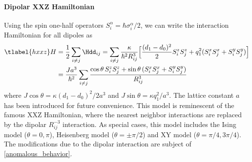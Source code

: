 \paragraph{Dipolar XXZ Hamiltonian}
Using the spin one-half operators $S^\alpha_i = \hbar \sigma^\alpha_i/2$, we can write the interaction Hamiltonian for all dipoles as
\begin{align} \tlabel{hxxz}
    H &= \frac{1}{2} \sum_{i\ne j} \Hdd_{ij} = \sum_{i\ne j} \frac{\kappa}{\hbar^2 R_{ij}^3} \Big[ \frac{(d_1-d_0)^2}{2} S^z_i S^z_j  + q_1^2 (S^x_i S^x_j + S^y_i S^y_j) \Big] \\
         &= \frac{Ja^3}{\hbar^2} \sum_{i\ne j} \frac{\cos\theta\, S^z_i S^z_j  + \sin\theta\, (S^x_i S^x_j + S^y_i S^y_j)}{R_{ij}^3}
\end{align}
where $J\cos\theta = \kappa (d_1-d_0)^2/2a^3$ and $J\sin\theta = \kappa q_1^2/a^3$. The lattice constant $a$ has been introduced for future convenience.
This model is reminescent of the famous XXZ Hamiltonian, where the nearest neighbor interactions are replaced by the dipolar $R_{ij}^{-3}$ interaction. As special cases, this model includes the Ising model ($\theta = 0, \pi$), Heisenberg model ($\theta=\pm \pi/2$) and XY model ($\theta=\pi/4, 3\pi/4$). The modifications due to the dipolar interaction are subject of \cref{anomalous_behavior}.

